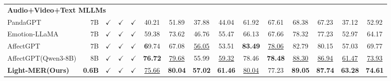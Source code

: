 \documentclass[sigconf]{acmart}
\begin{document}
\begin{table}[t]
{\begin{tabular}{lr|ccc|cccc|cccc|c|c}
        \midrule
        \multicolumn{15}{l}{\textbf{Audio+Video+Text MLLMs}} \\
        PandaGPT  \cite{su2023}       & 7B & $\checkmark$ & $\checkmark$ & $\checkmark$ & 40.21 & 51.89 & 37.88 & 44.04 & 61.92 & 67.61 & 68.38 & 67.23 & 37.12 & 52.92 \\
        Emotion-LLaMA \cite{Emotion-LLaMA}   & 7B & $\checkmark$ & $\checkmark$ & $\checkmark$ & 59.38 & 73.62 & 46.76 & 55.47 & 66.13 & 67.66 & 78.32 & 77.23 & 52.97 & 64.17 \\
        AffectGPT \cite{affectgpt} & 7B & $\checkmark$ & $\checkmark$ & $\checkmark$ & \textbf 69.74 & 67.08 & \underline{56.05} & 53.51 & \textbf{83.49} & \underline{78.06} & 82.79 & 80.15 & 57.03 & 69.77 \\
        AffectGPT(Qwen3-8B)& 8B & $\checkmark$ & $\checkmark$ & $\checkmark$ & \textbf{76.72} & \underline{79.68} & 55.99 & \underline{59.32} & 78.46 & \textbf{78.48} & \underline{88.30} & \underline{86.94} & \underline{61.47} & \underline{73.93} \\
        \textbf{Light-MER(Ours)}  & \textbf{0.6B} & $\checkmark$ & $\checkmark$ & $\checkmark$ & \underline{75.66} & \textbf{80.04} & \textbf{57.02} & \textbf{61.46} & \underline{80.04} & 77.23 & \textbf{89.05} & \textbf{87.74} & \textbf{63.28} & \textbf{74.61} \\
        \bottomrule
    \end{tabular}}
    \vspace{-0.5em}
\end{table}
\end{document}
